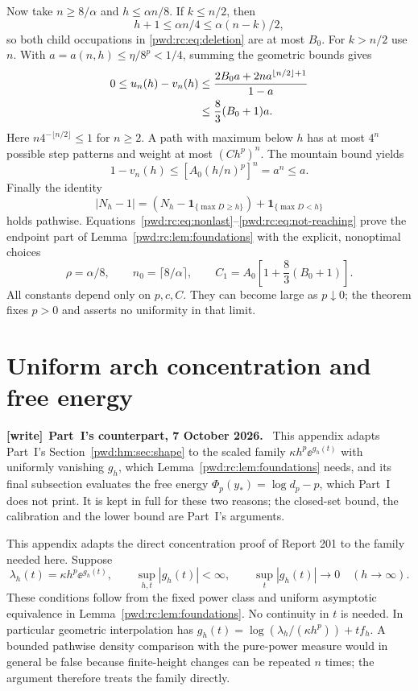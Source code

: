 \documentclass[11pt,letterpaper]{article}
\numberwithin{equation}{section}
\theoremstyle{remark}\newtheorem{remark}[theorem]{Remark}
\newenvironment{writenote}[1][]{\par\smallskip\begingroup\small
 \noindent\textbf{[write]}\if\relax\detokenize{#1}\relax\else~\textbf{#1.}\fi\ }%
 {\par\endgroup\smallskip}
\begin{document}
Now take $n\ge8/\alpha$ and $h\le\alpha n/8$. If $k\le n/2$, then
\[
 h+1\le\alpha n/4\le\alpha(n-k)/2,
\]
so both child occupations in \eqref{pwd:rc:eq:deletion} are at most $B_0$. For $k>n/2$ use $n$. With $a=a(n,h)\le\eta/8^p<1/4$, summing the geometric bounds gives
\begin{align}\label{pwd:rc:eq:nonlast}
 0\le u_n(h)-v_n(h)
 &\le\frac{2B_0a+2n a^{\lfloor n/2\rfloor+1}}{1-a}\notag\\
 &\le\frac83(B_0+1)a.
\end{align}
Here $n4^{-\lfloor n/2\rfloor}\le1$ for $n\ge2$. A path with maximum below $h$ has at most $4^n$ possible step patterns and weight at most $(Ch^p)^n$. The mountain bound yields
\begin{equation}\label{pwd:rc:eq:not-reaching}
 1-v_n(h)\le[A_0(h/n)^p]^n=a^n\le a.
\end{equation}
Finally the identity
\[
 |N_h-1|=(N_h-\mathbf1_{\{\max D\ge h\}})+\mathbf1_{\{\max D<h\}}
\]
holds pathwise. Equations~\eqref{pwd:rc:eq:nonlast}--\eqref{pwd:rc:eq:not-reaching} prove the endpoint part of Lemma~\ref{pwd:rc:lem:foundations} with the explicit, nonoptimal choices
\begin{equation}\label{pwd:rc:eq:rho}
 \rho=\alpha/8,\qquad n_0=\lceil8/\alpha\rceil,\qquad
 C_1=A_0\left[1+\frac83(B_0+1)\right].
\end{equation}
All constants depend only on $p,c,C$. They can become large as $p\downarrow0$; the theorem fixes $p>0$ and asserts no uniformity in that limit.


\section{Uniform arch concentration and free energy}\label{pwd:rc:app:shape}
\begin{writenote}[Part~I's counterpart, 7 October 2026]
This appendix adapts Part~I's Section~\ref{pwd:hm:sec:shape} to the scaled
family $\kappa h^p\ee^{g_h(t)}$ with uniformly vanishing $g_h$, which
Lemma~\ref{pwd:rc:lem:foundations} needs, and its final subsection evaluates
the free energy $\Phi_p(y_*)=\log d_p-p$, which Part~I does not print. It is
kept in full for these two reasons; the closed-set bound, the calibration and
the lower bound are Part~I's arguments.
\end{writenote}
This appendix adapts the direct concentration proof of Report 201 to the family needed here. Suppose
\[
 \lambda_h(t)=\kappa h^p\ee^{g_h(t)},\qquad
 \sup_{h,t}|g_h(t)|<\infty,\qquad
 \sup_t|g_h(t)|\longrightarrow0\quad(h\to\infty).
\]
These conditions follow from the fixed power class and uniform asymptotic equivalence in Lemma~\ref{pwd:rc:lem:foundations}. No continuity in $t$ is needed. In particular geometric interpolation has $g_h(t)=\log(\lambda_h/(\kappa h^p))+tf_h$. A bounded pathwise density comparison with the pure-power measure would in general be false because finite-height changes can be repeated $n$ times; the argument therefore treats the family directly.
\end{document}

